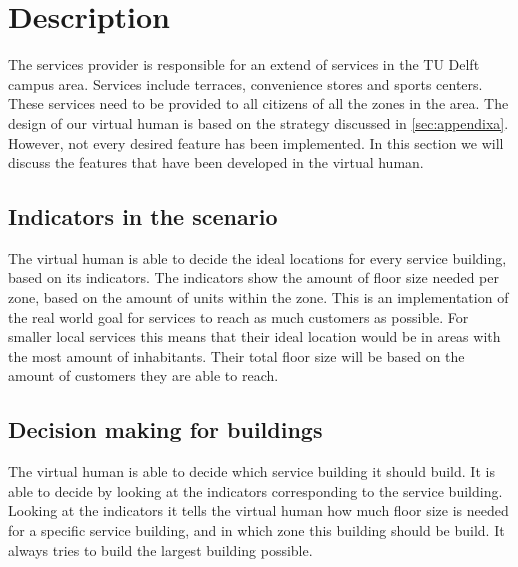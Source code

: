 \section{Description}
The services provider is responsible for an extend of services in the TU Delft campus area. Services include terraces, convenience stores and sports centers. These services need to be provided to all citizens of all the zones in the area. The design of our virtual human is based on the strategy discussed in \ref{sec:appendixa}. However, not every desired feature has been implemented. In this section we will discuss the features that have been developed in the virtual human.

\subsection{Indicators in the scenario}
The virtual human is able to decide the ideal locations for every service building, based on its indicators. The indicators show the amount of floor size needed per zone, based on the amount of units within the zone. This is an implementation of the real world goal for services to reach as much customers as possible. For smaller local services this means that their ideal location would be in areas with the most amount of inhabitants. Their total floor size will be based on the amount of customers they are able to reach. 


\subsection{Decision making for buildings}
The virtual human is able to decide which service building it should build. It is able to decide by looking at the indicators corresponding to the service building. Looking at the indicators it tells the virtual human how much floor size is needed for a specific service building, and in which zone this building should be build. It always tries to build the largest building possible.

